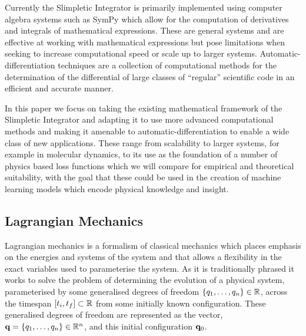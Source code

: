 \documentclass[10pt]{iopart}
\def\SI{Slimpletic Integrator}
\newcommand{\autodiff}{automatic-differentiation}
\begin{document}
Currently the \SI{} is primarily implemented using computer algebra systems such as SymPy\cite{sympy} which allow for the computation of derivatives and integrals of mathematical expressions. These are general systems and are effective at working with mathematical expressions but pose limitations when seeking to increase computational speed or scale up to larger systems. Automatic-differentiation techniques are a collection of computational methods for the determination of the differential of large classes of \enquote{regular} scientific code in an efficient and accurate manner.

In this paper we focus on taking the existing mathematical framework of the \SI{} and adapting it to use more advanced computational methods and making it amenable to \autodiff{} to enable a wide class of new applications. These range from scalability to larger systems, for example in molecular dynamics, to its use as the foundation of a number of physics based loss functions which we will compare for empirical and theoretical suitability, with the goal that these could be used in the creation of machine learning models which encode physical knowledge and insight.


\subsection{Lagrangian Mechanics}
\label{sec:lag-mech}

Lagrangian mechanics is a formalism of classical mechanics which places emphasis on the energies and systems of the system and that allows a flexibility in the exact variables used to parameterise the system. As it is traditionally phrased it works to solve the problem of determining the evolution of a physical system, parameterised by some generalised degrees of freedom $\left\{q_1, \dots, q_n\right\} \in \mathbb{R}$, across the timespan $[t_i, t_f] \subset \mathbb{R}$ from some initially known configuration. These generalised degrees of freedom are represented as the vector, $\vb q = \left\{q_1, \dots, q_n\right\} \in \mathbb{R}^n$, and this initial configuration $\vb q_0$.
\end{document}
